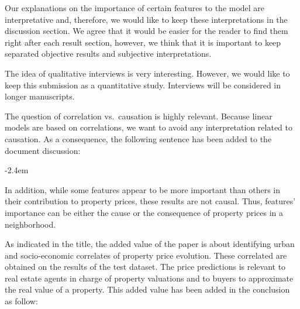 \documentclass[]{article}
\renewenvironment{quote}{\begin{fquote}\advance\leftmargini -2.4em\begin{oldquote}}{\end{oldquote}\end{fquote}}
\newenvironment{fquote}
  {\def\FrameCommand{
	\fboxsep=0.6em %
	\fcolorbox{black}{white}}%
    \MakeFramed {\advance\hsize-2\width \FrameRestore}
    \begin{minipage}{\linewidth}
  }
  {\end{minipage}\endMakeFramed}
\begin{document}
Our explanations on the importance of certain features to the model are interpretative and, therefore, we would like to keep these interpretations in the discussion section. We agree that it would be easier for the reader to find them right after each result section, however, we think that it is important to keep separated objective results and subjective interpretations.

The idea of qualitative interviews is very interesting. However, we would like to keep this submission as a quantitative study. Interviews will be considered in longer manuscripts.


The question of correlation vs.~causation is highly relevant. Because linear models are based on correlations, we want to avoid any interpretation related to causation. As a consequence, the following sentence has been added to the document discussion:

\begin{quote}
In addition, while some features appear to be more important than others in their contribution to property prices, these results are not causal. Thus, features' importance can be either the cause or the consequence of property prices in a neighborhood.
\end{quote}


As indicated in the title, the added value of the paper is about identifying urban and socio-economic correlates of property price evolution. These correlated are obtained on the results of the test dataset. The price predictions is relevant to real estate agents in charge of property valuations and to buyers to approximate the real value of a property. This added value has been added in the conclusion as follow:
\end{document}
